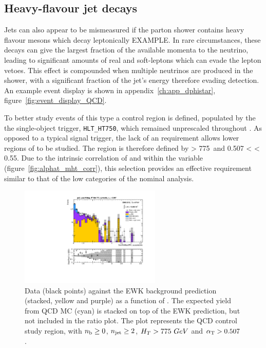 \subsection{Heavy-flavour jet decays}

Jets can also appear to be mismeasured if the parton
shower contains heavy flavour mesons which decay leptonically EXAMPLE. In rare
circumstances, these decays can give the largest fraction of the available
momenta to the neutrino, leading to significant amounts of real \met and
soft-leptons which can evade the lepton vetoes.
This effect is compounded when multiple neutrinos are produced in the shower,
with a significant fraction of the jet's energy therefore evading detection. An
example event display is shown in appendix~\ref{ch:app_dphistar},
figure~\ref{fig:event_display_QCD}.

To better study events of this type a control region is defined, populated by
the the single-object \HT trigger, \verb!HLT_HT750!, which remained unprescaled
throughout \runone. As opposed to a typical signal trigger, the lack of an
\alphat requirement allows lower regions of \alphat to be studied. The region is
therefore defined by \HT > 775~\gev and 0.507 < \alphat < 0.55. Due to the
intrinsic correlation of \HT and \mht within the
\alphat variable (figure~\ref{fig:alphat_mht_corr}), this selection provides
an effective \mht requirement similar to that of the low \HT categories of the
nominal analysis.

\begin{figure}[t]
  \centering
  \includegraphics[width=0.6\textwidth]
  {Figs/datapred/qcd_study_region/ge2j_ge0b_775_upwards/Prediction_ComMinBiasDPhi_acceptedJets_all_775_upwards_QCD}
  \caption{Data (black points) against the EWK background prediction 
  (stacked, yellow and purple) as a function of \mindphistar. The expected yield
  from QCD MC (cyan) is stacked on top of the EWK prediction, but not included
  in the ratio plot. The plot represents
  the QCD control study region, with $n_{\text{b}} \geq 0$, $n_{\text{jet}} \geq 2$, $H_T > 775
 ~GeV$ and $\alpha_{\text{T}} > 0.507$.}
  \label{fig:qcd_region_pred_dphistar_incl}
\end{figure}

